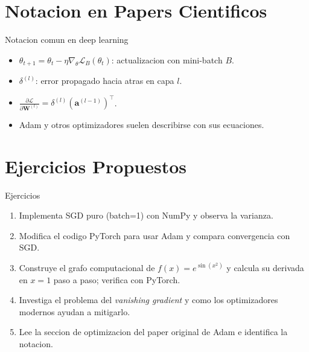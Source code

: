 \documentclass[aspectratio=169, 10pt, xcolor=table]{beamer}
\begin{document}
\section{Notacion en Papers Cientificos}

\begin{frame}{Notacion comun en deep learning}
    \begin{itemize}
        \item $\theta_{t+1} = \theta_t - \eta \nabla_\theta \mathcal{L}_B(\theta_t)$: actualizacion con mini-batch $B$.
        \item $\delta^{(l)}$: error propagado hacia atras en capa $l$.
        \item $\frac{\partial \mathcal{L}}{\partial \mathbf{W}^{(l)}} = \delta^{(l)} (\mathbf{a}^{(l-1)})^\top$.
        \item Adam y otros optimizadores suelen describirse con sus ecuaciones.
    \end{itemize}
\end{frame}

\section{Ejercicios Propuestos}

\begin{frame}{Ejercicios}
    \begin{enumerate}
        \item Implementa SGD puro (batch=1) con NumPy y observa la varianza.
        \item Modifica el codigo PyTorch para usar Adam y compara convergencia con SGD.
        \item Construye el grafo computacional de $f(x)=e^{\sin(x^2)}$ y calcula su derivada en $x=1$ paso a paso; verifica con PyTorch.
        \item Investiga el problema del \textit{vanishing gradient} y como los optimizadores modernos ayudan a mitigarlo.
        \item Lee la seccion de optimizacion del paper original de Adam e identifica la notacion.
    \end{enumerate}
\end{frame}
\end{document}
